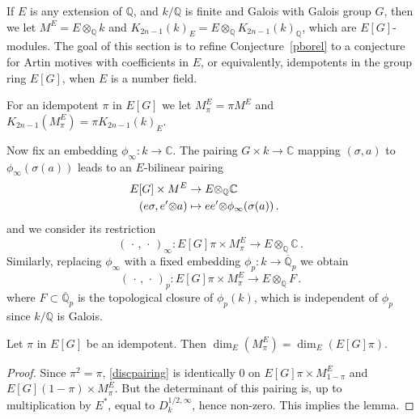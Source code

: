 \documentclass{amsart}
\begin{document}
If $ E $ is any extension of $ {\mathbb Q} $, and $ k/{\mathbb Q} $ is finite and Galois with Galois group $ G $,
then we let $ M^E = E {\otimes}_{\mathbb Q} k $ and $ {K_{2n-1}(k)_E}= E {\otimes}_{\mathbb Q} {K_{2n-1}(k)_{\mathbb Q}}$, which  are $ E[G] $-modules.
The goal of this section is to refine Conjecture~\ref{pborel} to a conjecture for Artin motives with
coefficients in $ E $, or equivalently, idempotents in the group ring $ E[G] $, when $ E $ is a number field.

\begin{definition}
For an idempotent $ \pi $ in $ E[G] $ we let $ M_\pi^E = \pi M^E $ and $ K_{2n-1} (M_\pi^E) = \pi {K_{2n-1}(k)_E}$.
\end{definition}

Now fix an embedding $ \phi_\infty : k \to {\mathbb C} $.
The pairing $ G \times k \to {\mathbb C} $ mapping $ ({\sigma},a) $ to $ \phi_\infty({\sigma}(a)) $ leads to an $ E $-bilinear
pairing
\begin{equation}
\begin{aligned}\label{discpairing}
E[G] \times M^E & \to E {\otimes}_{\mathbb Q} {\mathbb C}
\cr
(e {\sigma}, e' {\otimes} a ) & \mapsto e e' {\otimes} \phi_\infty({\sigma}(a))
\,.
\end{aligned}
\end{equation}
and we consider its restriction
\begin{equation*}
(\,\cdot\,,\,\cdot\,)_\infty : E[G]\pi \times M_\pi^E \to E {\otimes}_{\mathbb Q} {\mathbb C}
\,.
\end{equation*}
Similarly, replacing $ \phi_\infty $ with a fixed embedding $ \phi_p : k \to {{\overline {\mathbb Q}_p}} $ we obtain
\begin{equation*}
(\,\cdot\,,\,\cdot\,)_p : E[G]\pi \times M_\pi^E \to E {\otimes}_{\mathbb Q} F
\,.
\end{equation*}
where 
$ F \subset {{\overline {\mathbb Q}_p}} $ is the topological closure of $ \phi_p(k) $,
which is independent of $ \phi_p $ since $ k/{\mathbb Q} $ is Galois.

\begin{lemma}\label{dimlemma}
Let $ \pi $ in $ E[G] $ be an idempotent.  Then $ \dim_E(M_\pi^E) = \dim_E(E[G]\pi) $.
\end{lemma}

\begin{proof}
Since $ \pi^2 = \pi  $, \eqref{discpairing} is identically 0 on 
$ E[G]\pi \times  M_{1-\pi}^E $ and
$ E[G](1-\pi) \times  M_\pi^E $.
But the determinant of this pairing is, up to multiplication by
$ E^* $, equal to $ D_k^{1/2,\infty} $, hence non-zero.  This implies the lemma.
\end{proof}
\end{document}
